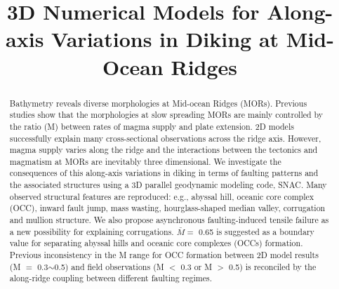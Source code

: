 \documentclass[draft,gc]{agutex}
\begin{document}
%
%


\title{3D Numerical Models for Along-axis Variations in Diking at Mid-Ocean Ridges}
%
%

%
%






%
%


\begin{abstract}
Bathymetry reveals diverse morphologies at Mid-ocean Ridges (MORs). Previous studies show that the morphologies at slow spreading MORs are mainly controlled by the ratio (M) between rates of magma supply and plate extension. 2D models successfully explain many cross-sectional observations across the ridge axis. However, magma supply varies along the ridge and the interactions between the tectonics and magmatism at MORs are inevitably three dimensional. We investigate the consequences of this along-axis variations in diking in terms of faulting patterns and the associated structures using a 3D parallel geodynamic modeling code, SNAC. Many observed structural features are reproduced: e.g., abyssal hill, oceanic core complex (OCC), inward fault jump, mass wasting, hourglass-shaped median valley, corrugation and mullion structure. We also propose asynchronous faulting-induced tensile failure as a new possibility for explaining corrugations. $\bar{M} =$ 0.65 is suggested as a boundary value for separating abyssal hills and oceanic core complexes (OCCs) formation. Previous inconsistency in the M range for OCC formation between 2D model results (M $=$ 0.3$\sim$0.5) and field observations (M $<$ 0.3 or M $>$ 0.5) is reconciled by the along-ridge coupling between different faulting regimes.  
\end{abstract}
\end{document}
